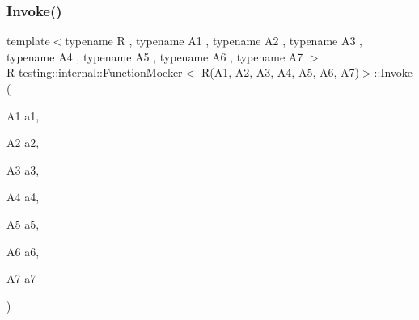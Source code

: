 \subsubsection{\texorpdfstring{Invoke()}{Invoke()}}
{\footnotesize\ttfamily template$<$typename R , typename A1 , typename A2 , typename A3 , typename A4 , typename A5 , typename A6 , typename A7 $>$ \\
R \mbox{\hyperlink{classtesting_1_1internal_1_1FunctionMocker}{testing\+::internal\+::\+Function\+Mocker}}$<$ R(A1, A2, A3, A4, A5, A6, A7)$>$\+::Invoke (\begin{DoxyParamCaption}\item[{A1}]{a1,  }\item[{A2}]{a2,  }\item[{A3}]{a3,  }\item[{A4}]{a4,  }\item[{A5}]{a5,  }\item[{A6}]{a6,  }\item[{A7}]{a7 }\end{DoxyParamCaption})\hspace{0.3cm}{\ttfamily [inline]}}

\mbox{\label{classtesting_1_1internal_1_1FunctionMocker_3_01R_07A1_00_01A2_00_01A3_00_01A4_00_01A5_00_01A6_00_01A7_08_4_a867b7a16d36bb314318265e1f4dbaf92}} 
